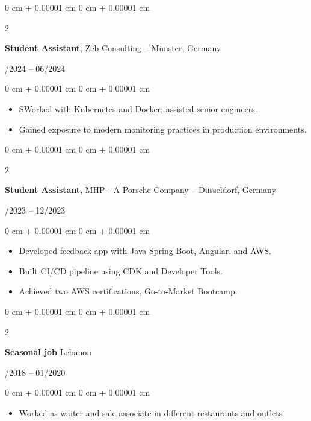 \documentclass[10pt, letterpaper]{article}
\newenvironment{highlights}{
    \begin{itemize}[
        topsep=0.10 cm,
        parsep=0.10 cm,
        partopsep=0pt,
        itemsep=0pt,
        leftmargin=0 cm + 10pt
    ]
}{
    \end{itemize}
} %
\newenvironment{onecolentry}{
    \begin{adjustwidth}{
        0 cm + 0.00001 cm
    }{
        0 cm + 0.00001 cm
    }
}{
    \end{adjustwidth}
} %
\newenvironment{twocolentry}[2][]{
    \onecolentry
    \def\secondColumn{#2}
    \setcolumnwidth{\fill, 4.5 cm}
    \begin{paracol}{2}
}{
    \switchcolumn \raggedleft \secondColumn
    \end{paracol}
    \endonecolentry
} %
\begin{document}
\vspace{0.2cm}

\begin{twocolentry}{01/2024 -- 06/2024}
\textbf{Student Assistant}, Zeb Consulting -- Münster, Germany
\end{twocolentry}
\begin{onecolentry}
\begin{highlights}
\item SWorked with Kubernetes and Docker; assisted senior engineers.
\item Gained exposure to modern monitoring practices in production environments.
\end{highlights}
\end{onecolentry}

\vspace{0.2cm}



\begin{twocolentry}{03/2023 -- 12/2023}
    \textbf{Student Assistant}, MHP - A Porsche Company -- Düsseldorf, Germany
    \end{twocolentry}
    \begin{onecolentry}
    \begin{highlights}
    \item Developed feedback app with Java Spring Boot, Angular, and AWS.
    \item Built CI/CD pipeline using CDK and Developer Tools.
    \item Achieved two AWS certifications, Go-to-Market Bootcamp.
    \end{highlights}
    \end{onecolentry}
    
    \vspace{0.2cm}

    \begin{twocolentry}{04/2018 -- 01/2020}
        \textbf{Seasonal job} Lebanon
        \end{twocolentry}
        \begin{onecolentry}
        \begin{highlights}
        \item  Worked as waiter and sale associate in different restaurants and outlets
        \end{highlights}
        \end{onecolentry}
        
        \vspace{0.2cm}
    
\end{document}
